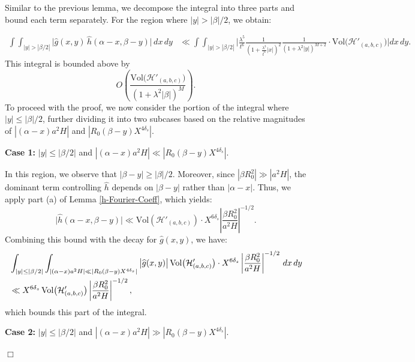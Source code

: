 \documentclass{article}
\def\Vol{{\rm Vol}}
\def\H{{\mathcal H}}
\def\H{{\mathcal H}}
\newenvironment{proof}{\noindent {\bf Proof:}}{$\Box$ \vspace{2 ex}}
\begin{document}
\begin{proof} Similar to the previous lemma, we decompose the integral into three parts and bound each term separately. For the region where $|y| > |\beta|/2$, we obtain:

\begin{align*} 
\int \int_{|y| > |\beta/2|} \big|\widehat{g}(x, y) \, \widehat{h}(\alpha - x, \beta - y)\big| \, dx \, dy &\ll \int \int_{|y| > |\beta/2|} \Big| \frac{\lambda^5}{t^6} \frac{1}{\left(1 + \frac{\lambda^3}{t^6} |x|\right)^{2}} \frac{1}{(1 + \lambda^2 |y|)^{M+2}} \cdot \mathrm{Vol}\big(\H'_{(a,b,c)}\big) \Big| dx \, dy. \end{align*}
This integral is bounded above by  
\begin{equation*}  
O \left(\frac{\mathrm{Vol}\big(\mathcal{H}'_{(a,b,c)}\big)}{(1 + \lambda^2 |\beta|)^M}\right).  
\end{equation*}  
To proceed with the proof, we now consider the portion of the integral where $|y| \leq |\beta|/2$, further dividing it into two subcases based on the relative magnitudes of $|(\alpha - x)a^2 H|$ and $|R_0 (\beta - y) X^{4\delta_s}|$.

\medskip
\noindent\textbf{Case 1:} $|y| \leq |\beta/2|$ and $|(\alpha - x)a^2 H| \ll |R_0 (\beta - y) X^{4\delta_s}|$.

In this region, we observe that $|\beta - y| \geq |\beta|/2$. Moreover, since $|\beta R_0^2| \gg |a^2 H|$, the dominant term controlling $\widehat{h}$ depends on $|\beta - y|$ rather than $|\alpha - x|$. Thus, we apply part (a) of Lemma \ref{h-Fourier-Coeff}, which yields:
\begin{equation*}
\big|\widehat{h}(\alpha - x, \beta - y)\big| \ll 
\text{Vol}(\H'_{(a,b,c)}) \cdot X^{6\delta_s} \left|\frac{\beta R_0^2}{a^2 H}\right|^{-1/2}.
\end{equation*}
Combining this bound with the decay for $\widehat{g}(x, y)$, we have:
\begin{align*}
    &\int_{|y| \leq |\beta/2|} \int_{|(\alpha - x)a^2 H| \ll |R_0 (\beta - y) X^{4\delta_s}|} \big|\widehat{g}(x, y)\big| \, \text{Vol}\big(\H'_{(a,b,c)}\big) \cdot X^{6\delta_s} \left|\frac{\beta R_0^2}{a^2 H}\right|^{-1/2} \, dx \, dy \\
    &\ll X^{6\delta_s} \, \Vol\big(\H'_{(a,b,c)}\big) \left|\frac{\beta R_0^2}{a^2 H}\right|^{-1/2},
\end{align*}
which bounds this part of the integral.

\medskip
\noindent\textbf{Case 2:} $|y| \leq |\beta/2|$ and $|(\alpha - x)a^2 H| \gg |R_0 (\beta - y) X^{4\delta_s}|$.


\end{proof}
\end{document}
